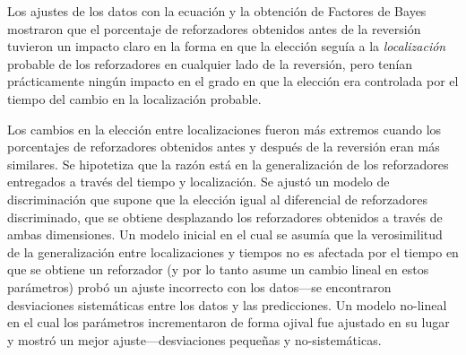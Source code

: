 \documentclass[a4paper,12pt]{article}
\begin{document}
Los ajustes de los datos con la ecuación y la obtención de Factores de Bayes mostraron que el porcentaje de reforzadores obtenidos antes de la reversión tuvieron un impacto claro en la forma en que la elección seguía a la {\itshape localización} probable de los reforzadores en cualquier lado de la reversión, pero tenían prácticamente ningún impacto en el grado en que la elección era controlada por el tiempo del cambio en la localización probable.

Los cambios en la elección entre localizaciones fueron más extremos cuando los porcentajes de reforzadores obtenidos antes y después de la reversión eran más similares. Se hipotetiza que la razón está en la generalización de los reforzadores entregados a través del tiempo y localización. Se ajustó un modelo de discriminación que supone que la elección igual al diferencial de reforzadores discriminado, que se obtiene desplazando los reforzadores obtenidos a través de ambas dimensiones. Un modelo inicial en el cual se asumía que la verosimilitud de la generalización entre localizaciones y tiempos no es afectada por el tiempo en que se obtiene un reforzador (y por lo tanto asume un cambio lineal en estos parámetros) probó un ajuste incorrecto con los datos---se encontraron desviaciones sistemáticas entre los datos y las predicciones. Un modelo no-lineal en el cual los parámetros incrementaron de forma ojival fue ajustado en su lugar y mostró un mejor ajuste---desviaciones pequeñas y no-sistemáticas.
\end{document}
